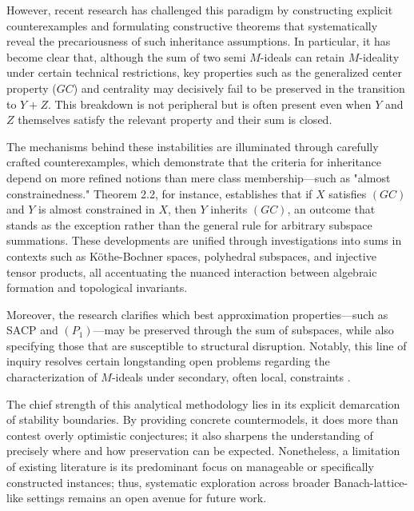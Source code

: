 \documentclass[sigconf]{acmart}
\begin{document}
However, recent research has challenged this paradigm by constructing explicit counterexamples and formulating constructive theorems that systematically reveal the precariousness of such inheritance assumptions. In particular, it has become clear that, although the sum of two semi $M$-ideals can retain $M$-ideality under certain technical restrictions, key properties such as the generalized center property ($GC$) and centrality may decisively fail to be preserved in the transition to $Y + Z$. This breakdown is not peripheral but is often present even when $Y$ and $Z$ themselves satisfy the relevant property and their sum is closed.

The mechanisms behind these instabilities are illuminated through carefully crafted counterexamples, which demonstrate that the criteria for inheritance depend on more refined notions than mere class membership—such as "almost constrainedness." Theorem 2.2, for instance, establishes that if $X$ satisfies $(GC)$ and $Y$ is almost constrained in $X$, then $Y$ inherits $(GC)$, an outcome that stands as the exception rather than the general rule for arbitrary subspace summations. These developments are unified through investigations into sums in contexts such as Köthe-Bochner spaces, polyhedral subspaces, and injective tensor products, all accentuating the nuanced interaction between algebraic formation and topological invariants.

Moreover, the research clarifies which best approximation properties—such as SACP and $(P_1)$—may be preserved through the sum of subspaces, while also specifying those that are susceptible to structural disruption. Notably, this line of inquiry resolves certain longstanding open problems regarding the characterization of $M$-ideals under secondary, often local, constraints \cite{ref103}.

The chief strength of this analytical methodology lies in its explicit demarcation of stability boundaries. By providing concrete countermodels, it does more than contest overly optimistic conjectures; it also sharpens the understanding of precisely where and how preservation can be expected. Nonetheless, a limitation of existing literature is its predominant focus on manageable or specifically constructed instances; thus, systematic exploration across broader Banach-lattice-like settings remains an open avenue for future work.
\end{document}
